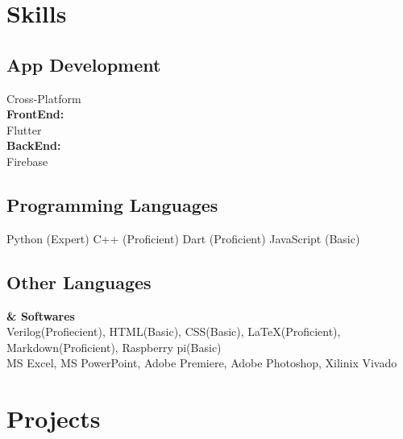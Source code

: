 \documentclass[]{plushcv}
\begin{document}
\begin{minipage}[t]{0.30\textwidth}



\section{Skills}
\subsection{App Development}
Cross-Platform\\
\textbf{FrontEnd:}\\ Flutter \\
\textbf{BackEnd:}\\ Firebase \\

\subsection{Programming Languages}
Python (Expert)
C++ (Proficient)
Dart (Proficient)
JavaScript (Basic)

\subsection{Other Languages}
\textbf{\& Softwares} \\
Verilog(Profiecient), 
HTML(Basic),
CSS(Basic),
LaTeX(Proficient),
Markdown(Proficient), 
Raspberry pi(Basic) \\

MS Excel, 
MS PowerPoint, 
Adobe Premiere, 
Adobe Photoshop, 
Xilinix Vivado



\section{Projects}


\end{minipage}
\end{document}
